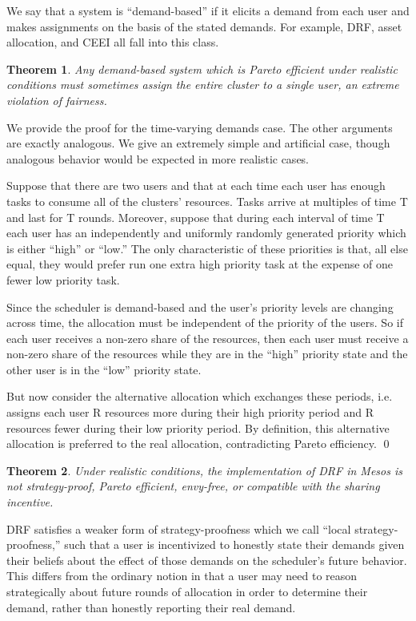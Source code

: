 \documentclass{acm_proc_article-sp}
\newtheorem{theorem}{Theorem}[section]
\newenvironment{pproof}[1][Proof]{\begin{trivlist}
\item[\hskip \labelsep {\bfseries #1}]}{\end{trivlist}}
\begin{document}
We say that a system is ``demand-based'' if it elicits a demand from each user and makes assignments on the basis of the stated demands. For example, DRF, asset allocation, and CEEI all fall into this class.
\vspace{-5mm}
\begin{theorem}\label{demand-bad}
Any demand-based system which is Pareto efficient under realistic conditions must sometimes assign the entire cluster to a single user, an extreme violation of fairness.
\end{theorem}
\vspace{-5mm}
\begin{pproof}
We provide the proof for the time-varying demands case. The other arguments are exactly analogous. We give an extremely simple and artificial case, though analogous behavior would be expected in more realistic cases.

Suppose that there are two users and that at each time each user has enough tasks to consume all of the clusters' resources. Tasks arrive at multiples of time T and last for T rounds. Moreover, suppose that during each interval of time T each user has an independently and uniformly randomly generated priority which is either ``high'' or ``low.'' The only characteristic of these priorities is that, all else equal, they would prefer run one extra high priority task at the expense of one fewer low priority task.

Since the scheduler is demand-based and the user's priority levels are changing across time, the allocation must be independent of the priority of the users. So if each user receives a non-zero share of the resources, then each user must receive a non-zero share of the resources while they are in the ``high'' priority state and the other user is in the ``low'' priority state. 

But now consider the alternative allocation which exchanges these periods, i.e. assigns each user R resources more during their high priority period and R resources fewer during their low priority period. By definition, this alternative allocation is preferred to the real allocation, contradicting Pareto efficiency.
\qed
\end{pproof}
\vspace{-5mm}
\begin{theorem}
Under realistic conditions, the implementation of DRF in Mesos is not strategy-proof, Pareto efficient, envy-free, or compatible with the sharing incentive. 
\end{theorem}
\vspace{-5mm}
DRF satisfies a weaker form of strategy-proofness which we call ``local strategy-proofness,'' 
such that a user is incentivized to honestly state their demands given their beliefs about the effect of those demands on the scheduler's future behavior. 
This differs from the ordinary notion in that a user may need to reason strategically about future rounds of allocation in order to determine
their demand, rather than honestly reporting their real demand.
\end{document}
